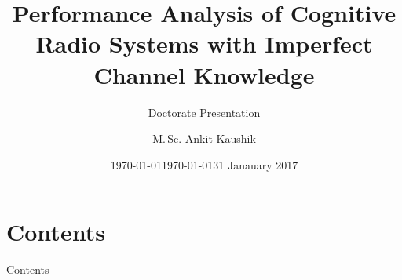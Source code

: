 \documentclass[16pt]{beamer}
\title[Performance Analysis of Cognitive Radio Systems with Imperfect Channel Knowledge]{Performance Analysis of Cognitive Radio Systems with Imperfect Channel Knowledge}
\subtitle{Doctorate Presentation}
\author[Ankit Kaushik]{M.\,Sc. Ankit Kaushik}
\date{\americandate\today}
\date{\germandate\today}
\institute{Communications Engineering Lab}
\date{31 Janauary 2017}
\newif\ifmoti
\newcommand{\fs}[2]{\fontsize{#1 pt}{#2}\selectfont}
\begin{document}
\begin{frame}
	\titlepage
\end{frame}

\section*{Contents}

\begin{frame}[t]{Contents}
	\fs{10}{15}
	\tableofcontents
\end{frame}

\ifmoti
%
\end{document}
